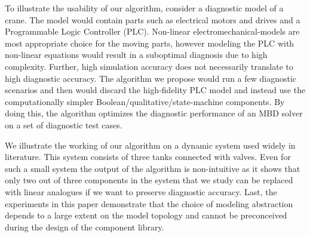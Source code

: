 \par
To illustrate the usability of our algorithm, consider a diagnostic
model of a crane. The model would contain parts such as electrical
motors and drives and a Programmable Logic Controller
(PLC). Non-linear electromechanical-models are most appropriate choice
for the moving parts, however modeling the PLC with non-linear
equations would result in a suboptimal diagnosis due to high
complexity. Further, high simulation accuracy does not necessarily
translate to high diagnostic accuracy. The algorithm we propose would
run a few diagnostic scenarios and then would discard the
high-fidelity PLC model and instead use the computationally simpler
Boolean/qualitative/state-machine components. By doing this, the
algorithm optimizes the diagnostic performance of an MBD solver on a
set of diagnostic test cases.
\par
We illustrate the working of our algorithm on a dynamic system used
widely in literature. This system consists of three tanks connected
with valves. Even for such a small system the output of the algorithm
is non-intuitive as it shows that only two out of three components in
the system that we study can be replaced with linear analogues if we
want to preserve diagnostic accuracy. Last, the experiments in this
paper demonstrate that the choice of modeling abstraction depends to a
large extent on the model topology and cannot be preconceived during
the design of the component library.
